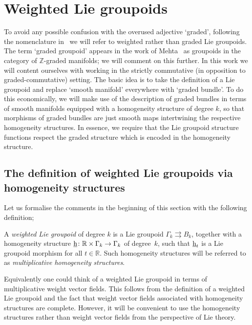 \documentclass[pdftex]{sigma}
\newcommand{\rmh}{\textnormal{h}}
\numberwithin{equation}{section}
\begin{document}
\section{Weighted Lie groupoids}\label{sec:weighted Lie groupoids}
To avoid any possible confusion with the overused adjective `graded', following the nomenclature in~\cite{Bruce:2014} we will refer to weighted rather than graded Lie groupoids.  The term  `graded groupoid' appears in the work of Mehta~\cite{Mehta:2006} as groupoids in the category of $\mathbb{Z}$-graded manifolds;  we will comment on this further. In this work we will content ourselves with working in the strictly commutative (in opposition to graded-commutative) setting. The basic idea is to take the def\/inition of a Lie groupoid and replace `smooth manifold' everywhere with `graded bundle'. To do this economically, we will make use of the description of graded bundles in terms of smooth manifolds equipped with a homogeneity structure of degree $k$,  so that morphisms of graded bundles are just smooth maps intertwining the respective homogeneity structures. In essence, we require that  the Lie groupoid structure functions respect the graded structure which is encoded in the homogeneity structure.

\subsection{The def\/inition of weighted Lie groupoids via homogeneity structures}
Let us formalise the comments in the beginning of this section with the following def\/inition;

\begin{Definition}
A \emph{weighted Lie groupoid} of degree $k$ is a Lie groupoid $\Gamma_{k} \rightrightarrows B_{k}$, together with a  homogeneity structure  $\underline{\rmh}\colon  \mathbb{R} \times \Gamma_{k} \rightarrow \Gamma_{k}$ of degree~$k$, such that $\underline{\rmh}_{t}$ is a Lie groupoid morphism for all $t \in \mathbb{R}$. Such homogeneity structures will be referred to as \emph{multiplicative homogeneity structures}.
\end{Definition}

\begin{Remark}
Equivalently one could think of a weighted Lie groupoid in terms of multiplicative weight vector f\/ields. This follows from the def\/inition of a weighted Lie groupoid and the fact that weight vector f\/ields associated with homogeneity structures are complete. However, it will be convenient to use the homogeneity structures rather than weight vector f\/ields from the perspective of Lie theory.
\end{Remark}
\end{document}
